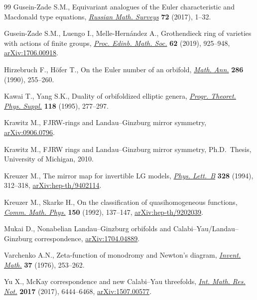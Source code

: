 \documentclass[pdftex]{sigma}
\numberwithin{equation}{section}
\begin{document}
\begin{thebibliography}{99}
Gusein-Zade S.M., Equivariant analogues of the {E}uler characteristic and
 {M}acdonald type equations, \href{https://doi.org/10.4213/rm9748}{\textit{Russian Math. Surveys}} \textbf{72} (2017), 1--32.

Gusein-Zade S.M., Luengo I., Melle-Hern\'andez A., Grothendieck ring of
 varieties with actions of finite groups, \href{https://doi.org/10.1017/s001309151900004x}{\textit{Proc. Edinb. Math. Soc.}} \textbf{62} (2019), 925--948, \href{https://arxiv.org/abs/1706.00918}{arXiv:1706.00918}.

Hirzebruch F., H\"ofer T., On the {E}uler number of an orbifold, \href{https://doi.org/10.1007/BF01453575}{\textit{Math.
 Ann.}} \textbf{286} (1990), 255--260.

Kawai T., Yang S.K., Duality of orbifoldized elliptic genera, \href{https://doi.org/10.1143/PTPS.118.277}{\textit{Progr.
 Theoret. Phys. Suppl.}} \textbf{118} (1995), 277--297.

Krawitz M., FJRW-rings and {L}andau--{G}inzburg mirror symmetry,
 \href{https://arxiv.org/abs/0906.0796}{arXiv:0906.0796}.

Krawitz M., F{JRW} rings and {L}andau--{G}inzburg mirror symmetry, Ph.D.~Thesis, {U}niversity of Michigan, 2010.

Kreuzer M., The mirror map for invertible {LG} models, \href{https://doi.org/10.1016/0370-2693(94)91485-0}{\textit{Phys. Lett.~B}}
 \textbf{328} (1994), 312--318, \href{https://arxiv.org/abs/hep-th/9402114}{arXiv:hep-th/9402114}.

Kreuzer M., Skarke H., On the classification of quasihomogeneous functions,
 \href{https://doi.org/10.1007/BF02096569}{\textit{Comm. Math. Phys.}} \textbf{150} (1992), 137--147,
 \href{https://arxiv.org/abs/hep-th/9202039}{arXiv:hep-th/9202039}.

Mukai D., Nonabelian {L}andau--{G}inzburg orbifolds and
 {C}alabi--{Y}au/{L}andau--{G}inzburg correspondence, \href{https://arxiv.org/abs/1704.04889}{arXiv:1704.04889}.

Varchenko A.N., Zeta-function of monodromy and {N}ewton's diagram,
 \href{https://doi.org/10.1007/BF01390323}{\textit{Invent. Math.}} \textbf{37} (1976), 253--262.

Yu X., Mc{K}ay correspondence and new {C}alabi--{Y}au threefolds, \href{https://doi.org/10.1093/imrn/rnv391}{\textit{Int.
 Math. Res. Not.}} \textbf{2017} (2017), 6444--6468, \href{https://arxiv.org/abs/1507.00577}{arXiv:1507.00577}.

\end{thebibliography}\LastPageEnding
\end{document}
